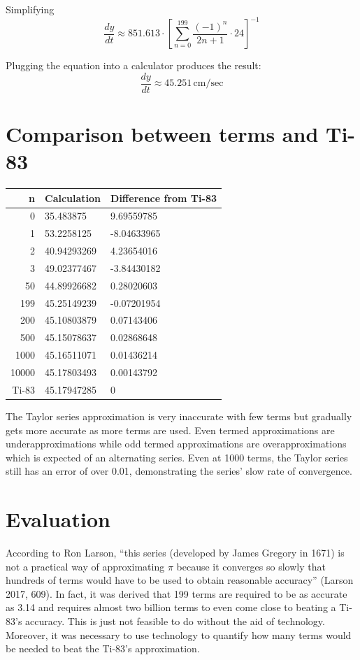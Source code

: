 \documentclass[12pt, titlepage]{article}
\begin{document}
Simplifying
\begin{equation*}
  \frac{dy}{dt} \approx 851.613 \cdot  [\sum_{n=0}^{199}{ \frac{(-1)^n}{2n+1} }  \cdot 24]^{-1}
\end{equation*}

Plugging the equation into a calculator produces the result:
\begin{equation*}
  \frac{dy}{dt} \approx 45.251 \,\textrm{cm/sec}
\end{equation*}

\section{Comparison between terms and Ti-83}
\begin{center}
  \begin{tabular}{rll}
  n & Calculation & Difference from Ti-83\\
  \hline
    0 & 35.483875 & 9.69559785\\
  1 & 53.2258125 & -8.04633965\\
  2 & 40.94293269 & 4.23654016\\
  3 & 49.02377467 & -3.84430182\\
  50 & 44.89926682& 0.28020603\\
  199 & 45.25149239 &-0.07201954 \\
  200 &  45.10803879& 0.07143406\\
  500 & 45.15078637 & 0.02868648\\
  1000 & 45.16511071 & 0.01436214\\
  10000 & 45.17803493 & 0.00143792\\
  \hline
  Ti-83 & 45.17947285  & 0\\
  \end{tabular}
\end{center}

The Taylor series approximation is very inaccurate with few terms but gradually gets more accurate as more terms are used. Even termed approximations are underapproximations while odd termed approximations are overapproximations which is expected of an alternating series. Even at 1000 terms, the Taylor series still has an error of over 0.01, demonstrating the series' slow rate of convergence. 

\section{Evaluation}
According to Ron Larson, ``this series (developed by James Gregory in 1671) is not a practical way of approximating \(\pi\) because it converges so slowly that hundreds of terms would have to be used to obtain reasonable accuracy” (Larson 2017, 609). In fact, it was derived that 199 terms are required to be as accurate as 3.14 and requires almost two billion terms to even come close to beating a Ti-83’s accuracy. This is just not feasible to do without the aid of technology. Moreover, it was necessary to use technology to quantify how many terms would be needed to beat the Ti-83’s approximation.
\end{document}
